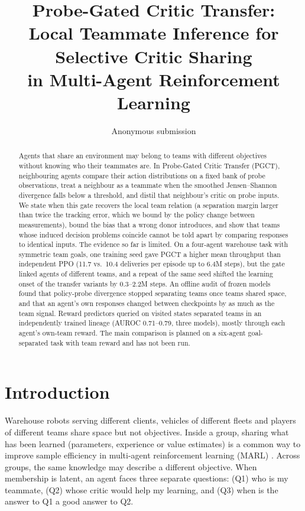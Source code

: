 \documentclass{article}
\title{Probe-Gated Critic Transfer:\\ Local Teammate Inference for Selective Critic Sharing\\ in Multi-Agent Reinforcement Learning}
\author{Anonymous submission}
\theoremstyle{remark}
\newcommand{\ours}{PGCT}
\begin{document}
\maketitle

\begin{abstract}
Agents that share an environment may belong to teams with different objectives without knowing who their teammates
are. In Probe-Gated Critic Transfer (\ours{}), neighbouring agents compare their action distributions on a fixed bank of
probe observations, treat a neighbour as a teammate when the smoothed Jensen--Shannon divergence falls below a threshold,
and distil that neighbour's critic on probe inputs. We state when this gate recovers the local team relation (a
separation margin larger than twice the tracking error, which we bound by the policy change between measurements), bound
the bias that a wrong donor introduces, and show that teams whose induced decision problems coincide cannot be told apart
by comparing responses to identical inputs. The evidence so far is limited. On a four-agent warehouse task with symmetric
team goals, one training seed gave \ours{} a higher mean throughput than independent PPO (11.7 vs.\ 10.4 deliveries per
episode up to 6.4M steps), but the gate linked agents of different teams, and a repeat of the same seed shifted the
learning onset of the transfer variants by 0.3--2.2M steps. An offline audit of frozen models found that policy-probe
divergence stopped separating teams once teams shared space, and that an agent's own responses changed between checkpoints
by as much as the team signal. Reward predictors queried on visited states separated teams in an independently trained
lineage (AUROC 0.71--0.79, three models), mostly through each agent's own-team reward. The main comparison is planned on a six-agent
goal-separated task with team reward and has not been run.
\end{abstract}

\section{Introduction}
Warehouse robots serving different clients, vehicles of different fleets and players of different teams share space but
not objectives. Inside a group, sharing what has been learned (parameters, experience or value estimates) is a common way
to improve sample efficiency in multi-agent reinforcement learning (MARL) \cite{christianos2020seac,christianos2021seps}.
Across groups, the same knowledge may describe a different objective. When membership is latent, an agent faces three
separate questions: (Q1) who is my teammate, (Q2) whose critic would help my learning, and (Q3) when is the answer to Q1 a
good answer to Q2.
\end{document}
